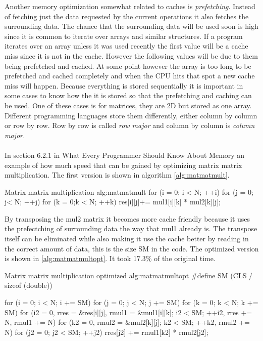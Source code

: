 \documentclass[10pt,a4paper]{report}
\newcounter{example}
\newcounter{algorithmCode}
\begin{document}
Another memory optimization somewhat related to caches is \emph{prefetching}\cite{introduction_hpc_hager, drepper2007cpumemory}. Instead of fetching just the data requested by the current operations it also fetches the surrounding data\cite{drepper2007cpumemory}. The chance that the surrounding data will be used soon is high since it is common to iterate over arrays and similar structures\cite{introduction_hpc_hager}. If a program iterates over an array unless it was used recently the first value will be a cache miss since it is not in the cache. However the following values will be due to them being prefetched and cached. At some point however the array is too long to be prefetched and cached completely and when the CPU hits that spot a new cache miss will happen\cite{drepper2007cpumemory}. Because everything is stored sequentially it is important in some cases to know how the it is stored so that the prefetching and caching can be used. One of these cases is for matrices, they are 2D but stored as one array. Different programming languages store them differently, either column by column or row by row. Row by row is called \emph{row major} and column by column is \emph{column major.}\\ %
\\
In section 6.2.1 in What Every Programmer Should Know About Memory\cite{drepper2007cpumemory} an example of how much speed that can be gained by optimizing matrix matrix multiplication. The first version is shown in algorithm \ref{alg:matmatmult}.

\begin{algorithmCode}{Matrix matrix multiplication} {alg:matmatmult}
for (i = 0; i < N; ++i)
  for (j = 0; j< N; ++j)
    for (k = 0;k < N; ++k)
      res[i][j]+= mul1[i][k] * mul2[k][j];
\end{algorithmCode}

By transposing the mul2 matrix it becomes more cache friendly because it uses the prefectching of surrounding data the way that mul1 already is\cite{drepper2007cpumemory}. The transpose itself can be eliminated while also making it use the cache better by reading in the correct amount of data, this is the size SM in the code\cite{drepper2007cpumemory}. The optimized version is shown in \ref{alg:matmatmultopt}. It took 17.3\% of the original time\cite{drepper2007cpumemory}.

\begin{algorithmCode}{Matrix matrix multiplication optimized} {alg:matmatmultopt}
#define SM (CLS / sizeof (double))

for (i = 0; i < N; i += SM)
  for (j = 0; j < N; j += SM)
    for (k = 0; k < N; k += SM)
      for (i2 = 0, rres = &res[i][j], rmul1 = &mul1[i][k]; i2 < SM; ++i2, rres += N, rmul1 += N)
	for (k2 = 0, rmul2 = &mul2[k][j]; k2 < SM; ++k2, rmul2 += N)
	  for (j2 = 0; j2 < SM; ++j2)
	    rres[j2] += rmul1[k2] * rmul2[j2];
\end{algorithmCode}
\end{document}
